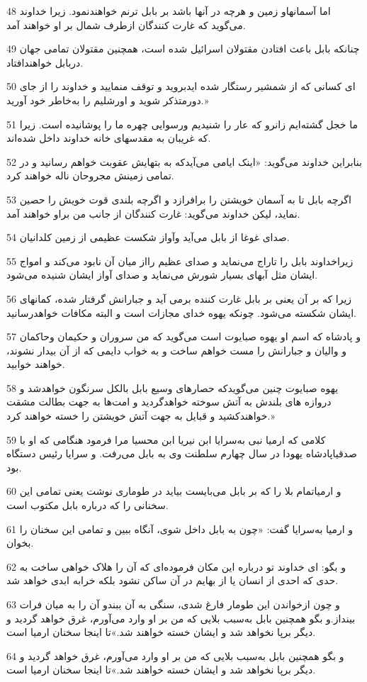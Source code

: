 \par 48 اما آسمانهاو زمین و هر‌چه در آنها باشد بر بابل ترنم خواهندنمود. زیرا خداوند می‌گوید که غارت کنندگان ازطرف شمال بر او خواهند آمد.
\par 49 چنانکه بابل باعث افتادن مقتولان اسرائیل شده است، همچنین مقتولان تمامی جهان دربابل خواهندافتاد.
\par 50 ‌ای کسانی که از شمشیر رستگار شده ایدبروید و توقف منمایید و خداوند را از جای دورمتذکر شوید و اورشلیم را به‌خاطر خود آورید.»
\par 51 ما خجل گشته‌ایم زانرو که عار را شنیدیم ورسوایی چهره ما را پوشانیده است. زیرا که غریبان به مقدسهای خانه خداوند داخل شده‌اند.
\par 52 بنابراین خداوند می‌گوید: «اینک ایامی می‌آیدکه به بتهایش عقوبت خواهم رسانید و در تمامی زمینش مجروحان ناله خواهند کرد.
\par 53 اگر‌چه بابل تا به آسمان خویشتن را برافرازد و اگر‌چه بلندی قوت خویش را حصین نماید، لیکن خداوند می‌گوید: غارت کنندگان از جانب من براو خواهند آمد.
\par 54 صدای غوغا از بابل می‌آید وآواز شکست عظیمی از زمین کلدانیان.
\par 55 زیراخداوند بابل را تاراج می‌نماید و صدای عظیم رااز میان آن نابود می‌کند و امواج ایشان مثل آبهای بسیار شورش می‌نماید و صدای آواز ایشان شنیده می‌شود.
\par 56 زیرا که بر آن یعنی بر بابل غارت کننده برمی آید و جبارانش گرفتار شده، کمانهای ایشان شکسته می‌شود. چونکه یهوه خدای مجازات است و البته مکافات خواهدرسانید.
\par 57 و پادشاه که اسم او یهوه صبایوت است می‌گوید که من سروران و حکیمان وحاکمان و والیان و جبارانش را مست خواهم ساخت و به خواب دایمی که از آن بیدار نشوند، خواهند خوابید.
\par 58 یهوه صبایوت چنین می‌گویدکه حصارهای وسیع بابل بالکل سرنگون خواهدشد و دروازه های بلندش به آتش سوخته خواهدگردید و امت‌ها به جهت بطالت مشقت خواهندکشید و قبایل به جهت آتش خویشتن را خسته خواهند کرد.» 
\par 59 کلامی که ارمیا نبی به‌سرایا ابن نیریا ابن محسیا مرا فرمود هنگامی که او با صدقیاپادشاه یهودا در سال چهارم سلطنت وی به بابل می‌رفت. و سرایا رئیس دستگاه بود.
\par 60 و ارمیاتمام بلا را که بر بابل می‌بایست بیاید در طوماری نوشت یعنی تمامی این سخنانی را که درباره بابل مکتوب است.
\par 61 و ارمیا به‌سرایا گفت: «چون به بابل داخل شوی، آنگاه ببین و تمامی این سخنان را بخوان.
\par 62 و بگو: ای خداوند تو درباره این مکان فرموده‌ای که آن را هلاک خواهی ساخت به حدی که احدی از انسان یا از بهایم در آن ساکن نشود بلکه خرابه ابدی خواهد شد.
\par 63 و چون ازخواندن این طومار فارغ شدی، سنگی به آن ببندو آن را به میان فرات بینداز.و بگو همچنین بابل به‌سبب بلایی که من بر او وارد می‌آورم، غرق خواهد گردید و دیگر برپا نخواهد شد و ایشان خسته خواهند شد.»تا اینجا سخنان ارمیا است.
\par 64 و بگو همچنین بابل به‌سبب بلایی که من بر او وارد می‌آورم، غرق خواهد گردید و دیگر برپا نخواهد شد و ایشان خسته خواهند شد.»تا اینجا سخنان ارمیا است.
 
